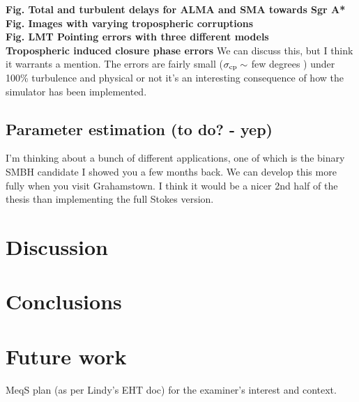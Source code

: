 \documentclass{article}
\begin{document}
{\bf Fig. Total and turbulent delays for ALMA and SMA towards Sgr A*}\\

{\bf Fig. Images with varying tropospheric corruptions}\\

{\bf Fig. LMT Pointing errors with three different models}\\

{\bf Tropospheric induced closure phase errors}
 We can discuss this, but I think it warrants a mention. The errors are fairly small ($\sigma_{\rm cp} \sim$ few degrees ) under 100\% turbulence and physical or not it's an interesting consequence of how the simulator has been implemented.

\subsection{Parameter estimation (to do? - yep)}

I'm thinking about a bunch of different applications, one of which is the binary SMBH candidate I showed you a few months back. We can develop this more fully when you visit Grahamstown. I think it would be a nicer 2nd half of the thesis than implementing the full Stokes version. 


\section{Discussion}

\section{Conclusions}

\section{Future work}
MeqS plan (as per Lindy's EHT doc) for the examiner's interest and context. 
\end{document}
